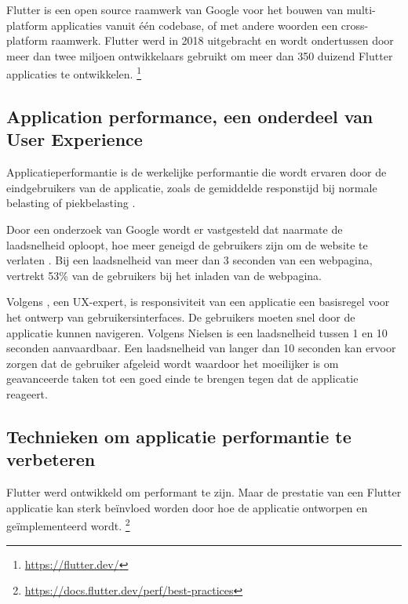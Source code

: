 Flutter is een open source raamwerk van Google voor het bouwen van  multi-platform applicaties vanuit één codebase, of met andere woorden een cross-platform raamwerk. Flutter werd in 2018 uitgebracht en wordt ondertussen door meer dan twee miljoen ontwikkelaars gebruikt om meer dan 350 duizend Flutter applicaties te ontwikkelen. \footnote{\url{https://flutter.dev/}}

\subsection{Application performance, een onderdeel van User Experience}
Applicatieperformantie is de werkelijke performantie die wordt ervaren door de eindgebruikers van de applicatie, zoals de gemiddelde responstijd bij normale belasting of piekbelasting \autocite{Rouse2014}.

Door een onderzoek van Google wordt er vastgesteld dat naarmate de laadsnelheid oploopt, hoe meer geneigd de gebruikers zijn om de website te verlaten \autocite{An2010}. Bij een laadsnelheid van meer dan 3 seconden van een webpagina, vertrekt 53\% van de gebruikers bij het inladen van de webpagina.

Volgens \textcite{Nielsen2010}, een UX-expert, is responsiviteit van een applicatie een basisregel voor het ontwerp van gebruikersinterfaces. De gebruikers moeten snel door de applicatie kunnen navigeren. Volgens Nielsen is een laadsnelheid tussen 1 en 10 seconden aanvaardbaar. Een laadsnelheid van langer dan 10 seconden kan ervoor zorgen dat de gebruiker afgeleid wordt waardoor het moeilijker is om geavanceerde taken tot een goed einde te brengen tegen dat de applicatie reageert.


\subsection{Technieken om applicatie performantie te verbeteren}
Flutter werd ontwikkeld om performant te zijn. Maar de prestatie van een Flutter applicatie kan sterk beïnvloed worden door hoe de applicatie ontworpen en geïmplementeerd wordt. \footnote{\url{https://docs.flutter.dev/perf/best-practices}}


